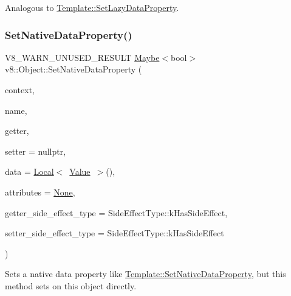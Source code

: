 Analogous to \mbox{\hyperlink{classv8_1_1Template_ab306ba858f4e71a25ebba4380ea5791f}{Template\+::\+Set\+Lazy\+Data\+Property}}. \mbox{\label{classv8_1_1Object_ac5ff13d780196543799030ae25333e4d}} 
\subsubsection{\texorpdfstring{Set\+Native\+Data\+Property()}{SetNativeDataProperty()}}
{\footnotesize\ttfamily V8\+\_\+\+W\+A\+R\+N\+\_\+\+U\+N\+U\+S\+E\+D\+\_\+\+R\+E\+S\+U\+LT \mbox{\hyperlink{classv8_1_1Maybe}{Maybe}}$<$bool$>$ v8\+::\+Object\+::\+Set\+Native\+Data\+Property (\begin{DoxyParamCaption}\item[{\mbox{\hyperlink{classv8_1_1Local}{Local}}$<$ Context $>$}]{context,  }\item[{\mbox{\hyperlink{classv8_1_1Local}{Local}}$<$ \mbox{\hyperlink{classv8_1_1Name}{Name}} $>$}]{name,  }\item[{Accessor\+Name\+Getter\+Callback}]{getter,  }\item[{Accessor\+Name\+Setter\+Callback}]{setter = {\ttfamily nullptr},  }\item[{\mbox{\hyperlink{classv8_1_1Local}{Local}}$<$ \mbox{\hyperlink{classv8_1_1Value}{Value}} $>$}]{data = {\ttfamily \mbox{\hyperlink{classv8_1_1Local}{Local}}$<$~\mbox{\hyperlink{classv8_1_1Value}{Value}}~$>$()},  }\item[{\mbox{\hyperlink{namespacev8_a05f25f935e108a1ea2d150e274602b87}{Property\+Attribute}}}]{attributes = {\ttfamily \mbox{\hyperlink{namespacev8_a05f25f935e108a1ea2d150e274602b87a7ab4d58719c33b3ea2dfaefa29b111df}{None}}},  }\item[{\mbox{\hyperlink{namespacev8_a29711319c2b9fc7716d65faee2f7b9cb}{Side\+Effect\+Type}}}]{getter\+\_\+side\+\_\+effect\+\_\+type = {\ttfamily SideEffectType\+:\+:kHasSideEffect},  }\item[{\mbox{\hyperlink{namespacev8_a29711319c2b9fc7716d65faee2f7b9cb}{Side\+Effect\+Type}}}]{setter\+\_\+side\+\_\+effect\+\_\+type = {\ttfamily SideEffectType\+:\+:kHasSideEffect} }\end{DoxyParamCaption})}

Sets a native data property like \mbox{\hyperlink{classv8_1_1Template_a771f6ca09e5c4789306f8638de5b99ed}{Template\+::\+Set\+Native\+Data\+Property}}, but this method sets on this object directly. \mbox{\label{classv8_1_1Object_a1f1fc25d2a440ad2a8b7d94db04f88fb}} 
